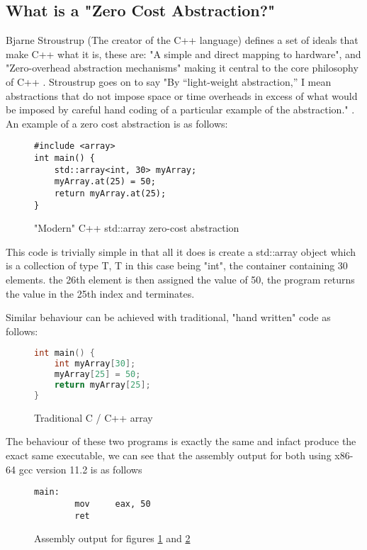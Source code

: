 \documentclass{article}
\begin{document}
\subsection{What is a "Zero Cost Abstraction?"}
Bjarne Stroustrup (The creator of the C++ language) defines a set of ideals that make C++ what it is, these are: "A simple and direct mapping to hardware", and "Zero-overhead abstraction mechanisms" making it central to the core philosophy of C++ \parencite{stroustrup-presentation}. Stroustrup goes on to say "By “light-weight abstraction,” I mean abstractions that do not impose space or time overheads in excess of what would be imposed by careful hand coding of a particular example of the abstraction." \parencite{stroustrup-presentation}. An example of a zero cost abstraction is as follows:

\begin{figure}[H]
	\begin{lstlisting}
#include <array>
int main() {
    std::array<int, 30> myArray;
    myArray.at(25) = 50;
    return myArray.at(25);
}
				\end{lstlisting}
	\caption{"Modern" C++ std::array zero-cost abstraction}
\label{figure:c++_zero_cost_abstraction}
\end{figure}

This code is trivially simple in that all it does is create a std::array object which is a collection of type T, T in this case being "int", the container containing 30 elements. the 26th element is then assigned the value of 50, the program returns the value in the 25th index and terminates.

Similar behaviour can be achieved with traditional, "hand written" code as follows:
\begin{figure}[H]
	\begin{lstlisting}[language=c++]
int main() {
    int myArray[30];
    myArray[25] = 50;
    return myArray[25];
}
				\end{lstlisting}
	\caption{Traditional C / C++ array}
\label{figure:c++_traditional_array}
\end{figure}
The behaviour of these two programs is exactly the same and infact produce the exact same executable, we can see that the assembly output for both using x86-64 gcc version 11.2 is as follows

\begin{figure}[H]
	\begin{lstlisting}[language={[x86masm]Assembler}]
main:
        mov     eax, 50
        ret
				\end{lstlisting}
	\caption{Assembly output for figures \ref{figure:c++_zero_cost_abstraction} and \ref{figure:c++_traditional_array}}
	\label{figure:code:assembly_c++_array}
\end{figure}
\end{document}
